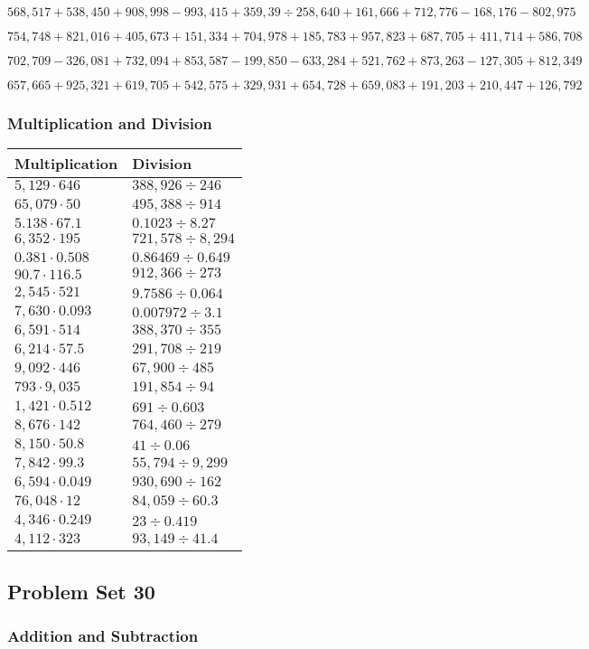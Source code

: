 \(568,517+538,450+908,998-993,415+359,39÷258,640+161,666+712,776-168,176-802,975\)

\(754,748+821,016+405,673+151,334+704,978+185,783+957,823+687,705+411,714+586,708\)

\(702,709-326,081+732,094+853,587-199,850-633,284+521,762+873,263-127,305+812,349\)

\(657,665+925,321+619,705+542,575+329,931+654,728+659,083+191,203+210,447+126,792\)

\hypertarget{multiplication-and-division-333}{%
\subsubsection{Multiplication and
Division}\label{multiplication-and-division-333}}

\begin{longtable}[]{@{}ll@{}}
\toprule
Multiplication & Division\tabularnewline
\midrule
\endhead
\(5,129\cdot646\) & \(388,926÷246\)\tabularnewline
\(65,079\cdot50\) & \(495,388÷914\)\tabularnewline
\(5.138\cdot67.1\) & \(0.1023÷8.27\)\tabularnewline
\(6,352\cdot195\) & \(721,578÷8,294\)\tabularnewline
\(0.381\cdot0.508\) & \(0.86469÷0.649\)\tabularnewline
\(90.7\cdot116.5\) & \(912,366÷273\)\tabularnewline
\(2,545\cdot521\) & \(9.7586÷0.064\)\tabularnewline
\(7,630\cdot0.093\) & \(0.007972÷3.1\)\tabularnewline
\(6,591\cdot514\) & \(388,370÷355\)\tabularnewline
\(6,214\cdot57.5\) & \(291,708÷219\)\tabularnewline
\(9,092\cdot446\) & \(67,900÷485\)\tabularnewline
\(793\cdot9,035\) & \(191,854÷94\)\tabularnewline
\(1,421\cdot0.512\) & \(691÷0.603\)\tabularnewline
\(8,676\cdot142\) & \(764,460÷279\)\tabularnewline
\(8,150\cdot50.8\) & \(41÷0.06\)\tabularnewline
\(7,842\cdot99.3\) & \(55,794÷9,299\)\tabularnewline
\(6,594\cdot0.049\) & \(930,690÷162\)\tabularnewline
\(76,048\cdot12\) & \(84,059÷60.3\)\tabularnewline
\(4,346\cdot0.249\) & \(23÷0.419\)\tabularnewline
\(4,112\cdot323\) & \(93,149÷41.4\)\tabularnewline
\bottomrule
\end{longtable}

\hypertarget{problem-set-30-5}{%
\subsection{Problem Set 30}\label{problem-set-30-5}}

\hypertarget{addition-and-subtraction-335}{%
\subsubsection{Addition and
Subtraction}\label{addition-and-subtraction-335}}

